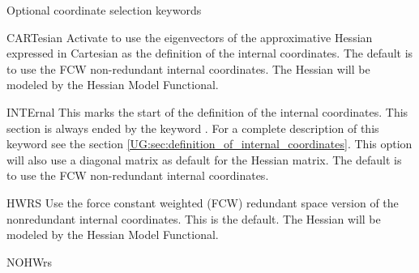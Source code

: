 Optional coordinate selection keywords
\begin{keywordlist}
\item[CARTesian]
Activate  to use the eigenvectors
of the approximative Hessian expressed in Cartesian as the
definition of the internal coordinates. The default is to
use the FCW non-redundant internal coordinates.
The Hessian will be modeled by the Hessian Model Functional.
\item[INTErnal]
This marks the start of the definition of the internal
coordinates. This section is always ended by the keyword
.
For a complete description of this
keyword see the section
\ref{UG:sec:definition_of_internal_coordinates}.
This option will also use a diagonal matrix as default for
the Hessian matrix.
The default is to
use the FCW non-redundant internal coordinates.
\item[HWRS]
Use the force constant weighted (FCW) redundant space version of the
nonredundant internal coordinates. This is the default.
The Hessian will be modeled by the Hessian Model Functional.
\item[NOHWrs]

\end{keywordlist}
